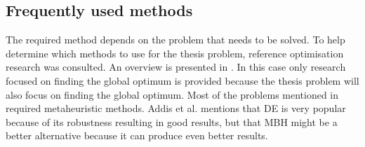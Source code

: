 \subsection{Frequently used methods}
\label{subsec:freqmeth}
The required method depends on the problem that needs to be solved. To help determine which methods to use for the thesis problem, reference optimisation research was consulted. An overview is presented in . In this case only research focused on finding the global optimum is provided because the thesis problem will also focus on finding the global optimum. Most of the problems mentioned in  required metaheuristic methods. Addis et al. \cite{addis2011} mentions that \ac{DE} is very popular because of its robustness resulting in good results, but that \ac{MBH} might be a better alternative because it can produce even better results. 




